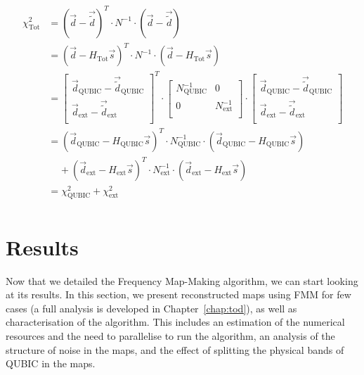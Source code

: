 \documentclass[../../thesis.tex]{subfiles}
\begin{document}
\begin{align*}
     \chi^2_\text{Tot} &= \left( \vec{d} - \vec{\tilde{d}}\right)^T \cdot N^{-1} \cdot \left( \vec{d} - \vec{\tilde{d}}\right) \nonumber \\
    &= \left( \vec{d} - H_\text{Tot} \vec{s}\right)^T \cdot N^{-1} \cdot \left( \vec{d} - H_\text{Tot} \vec{s}\right) \nonumber \\
    &=
    \begin{bmatrix}
        \vec{d}_\text{QUBIC} - \vec{\tilde{d}}_\text{QUBIC} \\
        \vec{d}_\text{ext} - \vec{\tilde{d}}_\text{ext} \\
    \end{bmatrix}^T \cdot
    \begin{bmatrix}
        N^{-1}_\text{QUBIC} & 0 \\
        0 &  N^{-1}_\text{ext} \\
    \end{bmatrix} \cdot
    \begin{bmatrix}
        \vec{d}_\text{QUBIC} - \vec{\tilde{d}}_\text{QUBIC} \\
        \vec{d}_\text{ext} - \vec{\tilde{d}}_\text{ext} \\
    \end{bmatrix} \\
    &= \left( \vec{d}_\text{QUBIC} - H_{\text{QUBIC}} \vec{s}\right)^T \cdot N^{-1}_\text{QUBIC} \cdot \left( \vec{d}_\text{QUBIC} - H_{\text{QUBIC}}\vec{s} \right) \\
    &~~~~~+
    \left( \vec{d}_\text{ext} - H_{\text{ext}} \vec{s}\right)^T \cdot N^{-1}_\text{ext} \cdot \left( \vec{d}_\text{ext} - H_{\text{ext}}\vec{s} \right) \\
    &= \chi^2_\text{QUBIC} + \chi^2_\text{ext} \\
\end{align*}

\section{Results}

Now that we detailed the Frequency Map-Making algorithm, we can start looking at its results. In this section, we present reconstructed maps using FMM for few cases (a full analysis is developed in Chapter~\ref{chap:tod}), as well as characterisation of the algorithm. This includes an estimation of the numerical resources and the need to parallelise to run the algorithm, an analysis of the structure of noise in the maps, and the effect of splitting the physical bands of QUBIC in the maps. 
\end{document}
